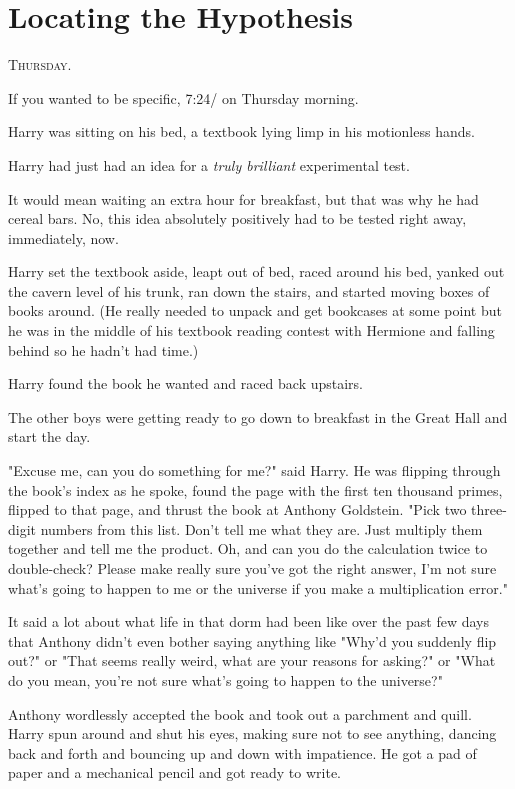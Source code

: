 \chapter{Locating the Hypothesis}

\lettrine{T}{hursday}.

If you wanted to be specific, 7:24\AM/ on Thursday morning.

Harry was sitting on his bed, a textbook lying limp in his motionless hands.

Harry had just had an idea for a \emph{truly brilliant} experimental test.

It would mean waiting an extra hour for breakfast, but that was why he had
cereal bars. No, this idea absolutely positively had to be tested right away,
immediately, now.

Harry set the textbook aside, leapt out of bed, raced around his bed, yanked
out the cavern level of his trunk, ran down the stairs, and started moving
boxes of books around. (He really needed to unpack and get bookcases at some
point but he was in the middle of his textbook reading contest with Hermione
and falling behind so he hadn't had time.)

Harry found the book he wanted and raced back upstairs.

The other boys were getting ready to go down to breakfast in the Great Hall and
start the day.

"Excuse me, can you do something for me?" said Harry. He was flipping through
the book's index as he spoke, found the page with the first ten thousand
primes, flipped to that page, and thrust the book at Anthony Goldstein. "Pick
two three-digit numbers from this list. Don't tell me what they are. Just
multiply them together and tell me the product. Oh, and can you do the
calculation twice to double-check? Please make really sure you've got the right
answer, I'm not sure what's going to happen to me or the universe if you make a
multiplication error."

It said a lot about what life in that dorm had been like over the past few days
that Anthony didn't even bother saying anything like "Why'd you suddenly flip
out?" or "That seems really weird, what are your reasons for asking?" or "What
do you mean, you're not sure what's going to happen to the universe?"

Anthony wordlessly accepted the book and took out a parchment and quill. Harry
spun around and shut his eyes, making sure not to see anything, dancing back
and forth and bouncing up and down with impatience. He got a pad of paper and a
mechanical pencil and got ready to write.

